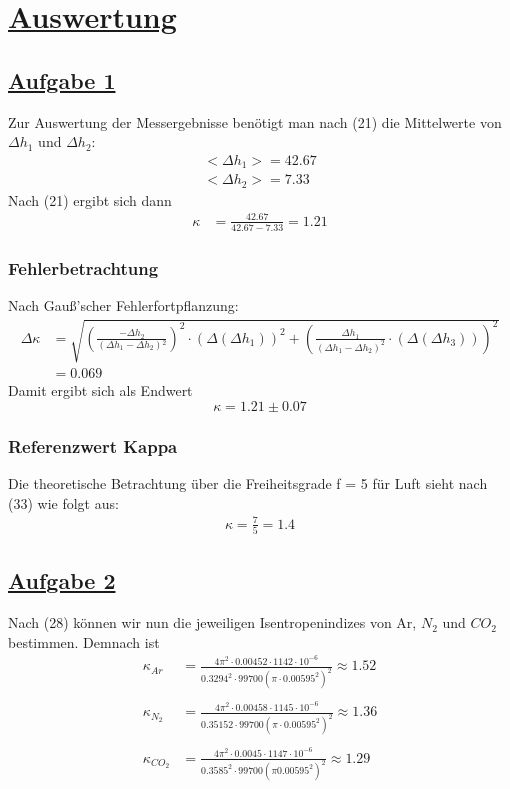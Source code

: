 \documentclass[11pt,a4paper]{article}
\begin{document}
  \section{\underline{Auswertung}}
\subsection{\underline{Aufgabe 1}}
Zur Auswertung der Messergebnisse benötigt man nach (21) die Mittelwerte von $\Delta h_{1} $ und $\Delta h_{2}$:
\begin{align}
  <\Delta h_{1}> = 42.67 \\
  <\Delta h_{2}> = 7.33
\end{align}
Nach (21) ergibt sich dann
\begin{align}
  \kappa &= \frac{42.67}{42.67-7.33} = 1.21
\end{align}
\subsubsection{Fehlerbetrachtung}
Nach Gauß'scher Fehlerfortpflanzung:
\begin{align}
    \Delta \kappa &= \sqrt{{\left(\frac{- \Delta h_{2}}{{(\Delta h_{1}-\Delta
    h_{2})}{^2}}\right)}^{2} \cdot {(\Delta(\Delta h_{1}))}^{2}+{\left(\frac{\Delta
    h_{1}}{{(\Delta h_{1} - \Delta h_{2})}^{2}}\cdot (\Delta(\Delta h_{3}))\right)}^{2}}\\
&= 0.069
\end{align}
Damit ergibt sich als Endwert
\begin{equation}
  \kappa = 1.21 \pm 0.07
\end{equation}

\subsubsection{Referenzwert Kappa}
Die theoretische Betrachtung über die Freiheitsgrade f = 5 für Luft sieht nach
(33) wie folgt aus:
\begin{align}
    \kappa = \frac{7}{5} = 1.4
\end{align}
\subsection{\underline{Aufgabe 2}}
 Nach (28) k\"onnen wir nun die jeweiligen Isentropenindizes von Ar, $N_{2}$ und $CO_{2}$
 bestimmen. Demnach ist 
 \begin{align*}
     {\kappa}_{Ar} &=\frac{4{\pi}^{2}\cdot0.00452\cdot1142\cdot{10}^{-6}}
     {{0.3294}^{2}\cdot99700{(\pi\cdot{0.00595}^{2})}^{2}} \approx 1.52 \\ \\
     {\kappa}_{{N}_{2}} &= \frac{4{\pi}^{2}\cdot0.00458\cdot1145\cdot{10}^{-6}}
     {{0.3515}{2}\cdot99700{(\pi\cdot{0.00595}^{2})}^{2}} \approx 1.36 \\ \\
     {\kappa}_{{CO}_{2}} &= \frac{4{\pi}^{2}\cdot0.0045\cdot1147\cdot{10}^{-6}}
     {{0.3585}^{2}\cdot99700{(\pi{0.00595}^{2})}^{2}} \approx 1.29
 \end{align*}
\end{document}

